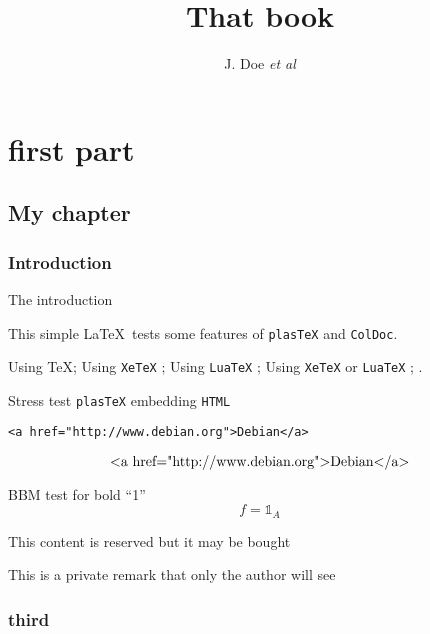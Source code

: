 \documentclass[a4paper]{book}
\newif\ifplastex\plastexfalse
\newcommand\mathbbm[1]{{\mathbb{#1}}}
\begin{document}
\author{J. Doe
\emph{et al}
}
\title{That book}

\maketitle

\part{first part}

\chapter{My chapter}

\section*{Introduction}
The introduction

\begin{Rem}
  This simple \LaTeX\ tests some features
  of \texttt{plasTeX} and \texttt{ColDoc}.

  \ifetex Using  \TeX \fi ;
  \ifxetex Using \texttt{XeTeX} \fi ;
  \ifluatex Using \texttt{LuaTeX} \fi ;
  \iftutex Using \texttt{XeTeX} or \texttt{LuaTeX} \fi ;
  \ifplastex Using \texttt{plasTeX} \fi .

\end{Rem}

Stress test  \texttt{plasTeX} embedding \texttt{HTML}
\begin{verbatim}
<a href="http://www.debian.org">Debian</a>
\end{verbatim}
\[ \hbox{<a href="http://www.debian.org">Debian</a>} \]

BBM test for bold ``1''
\[f={\mathbbm{1}}_A\]

\begin{buyablecontent}
  This content is reserved but it may be bought
\end{buyablecontent}

\begin{privateremark}
  This is a private remark that only the author will see
\end{privateremark}





\section{third}
\end{document}
